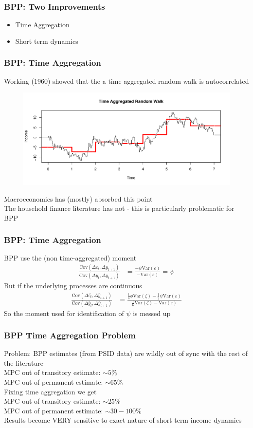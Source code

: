 \documentclass{beamer}
\begin{document}
\frame
{
	\frametitle{BPP: Two Improvements}
	\begin{itemize}
		\item Time Aggregation
		\item Short term dynamics
	\end{itemize}
}
\frame
{
	\frametitle{BPP: Time Aggregation}
	Working (1960) showed that the a time aggregated random walk is autocorrelated
	\begin{figure}
		\includegraphics[scale=0.4]{../Figures/timeagg_rw.pdf}
	\end{figure}
	\pause
	Macroeconomics has (mostly) absorbed this point\\
	The household finance literature has not - this is particularly problematic for BPP
}
\frame
{
	\frametitle{BPP: Time Aggregation}
	BPP use the (non time-aggregated) moment
	\begin{align*}
		\frac{\mathrm{Cov}(\Delta c_t, \Delta y_{t+1})}{\mathrm{Cov}( \Delta y_t, \Delta y_{t+1})} &= \frac{-\psi \mathrm{Var}(\varepsilon)}{-\mathrm{Var}( \varepsilon)}= \psi
	\end{align*}
	\pause
	But if the underlying processes are continuous
	\begin{align*}
	\frac{\mathrm{Cov}(\Delta \bar{c_t}, \Delta \bar{y}_{t+1})}{\mathrm{Cov}( \Delta \bar{y}_t, \Delta \bar{y}_{t+1})}
	&= \frac{ \frac{1}{6}\phi \mathrm{Var}(\zeta) - \frac{1}{2}\psi \mathrm{Var}(\varepsilon)}{ \frac{1}{6} \mathrm{Var}(\zeta) -  \mathrm{Var}(\varepsilon)}
	\end{align*}
	So the moment used for identification of $\psi$ is messed up
}
\frame
{
	\frametitle{BPP Time Aggregation Problem}
	Problem: BPP estimates (from PSID data) are wildly out of sync with the rest of the literature\\
	\bigskip
	MPC out of transitory estimate:  $\sim 5\%$\\
	MPC out of permanent estimate:  $\sim 65\%$ \\
	\pause
	\bigskip
	Fixing time aggregation we get\\
	\bigskip
	MPC out of transitory estimate:  $\sim 25\%$\\
	MPC out of permanent estimate:  $\sim 30-100\%$ \\
	\bigskip
	Results become VERY sensitive to exact nature of short term income dynamics
}
\end{document}
